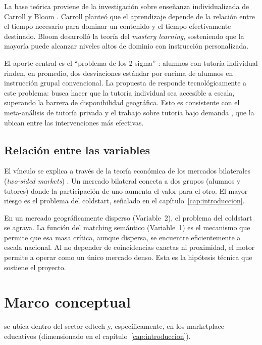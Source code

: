 La base teórica proviene de la investigación sobre enseñanza
individualizada de Carroll \citep{carroll1963} y Bloom
\citep{bloom1968, bloom1984}. Carroll planteó que el aprendizaje depende
de la relación entre el tiempo necesario para dominar un contenido y el
tiempo efectivamente destinado. Bloom desarrolló la teoría del
\emph{mastery learning}, sosteniendo que la mayoría puede alcanzar
niveles altos de dominio con instrucción personalizada.

El aporte central es el ``problema de los 2 sigma'' \citep{bloom1984}:
alumnos con tutoría individual rinden, en promedio, dos desviaciones
estándar por encima de alumnos en instrucción grupal convencional. La
propuesta de \sistema{} responde tecnológicamente a este problema: busca
hacer que la tutoría individual sea accesible a escala, superando la
barrera de disponibilidad geográfica. Esto es consistente con el
meta-análisis de tutoría privada \citep{sciencedirect2022} y el trabajo
sobre tutoría bajo demanda \citep{ondemand2026}, que la ubican entre las
intervenciones más efectivas.

\subsection{Relación entre las variables}

El vínculo se explica a través de la teoría económica de los mercados
bilaterales (\emph{two-sided markets}) \citep{rochet2006}. Un mercado
bilateral conecta a dos grupos (alumnos y tutores) donde la participación
de uno aumenta el valor para el otro. El mayor riesgo es el problema del
\gls{coldstart}, señalado en el capítulo~\ref{cap:introduccion}.

En un mercado geográficamente disperso (Variable~2), el problema del
\gls{coldstart} se agrava. La función del \gls{matching} semántico
(Variable~1) es el mecanismo que permite que esa masa crítica, aunque
dispersa, se encuentre eficientemente a escala nacional. Al no depender
de coincidencias exactas ni proximidad, el motor permite a \sistema{}
operar como un único mercado denso. Esta es la hipótesis técnica que
sostiene el proyecto.

\section{Marco conceptual}

\sistema{} se ubica dentro del sector \gls{edtech} y, específicamente, en
los \gls{marketplace} educativos (dimensionado en el
capítulo~\ref{cap:introduccion}).

